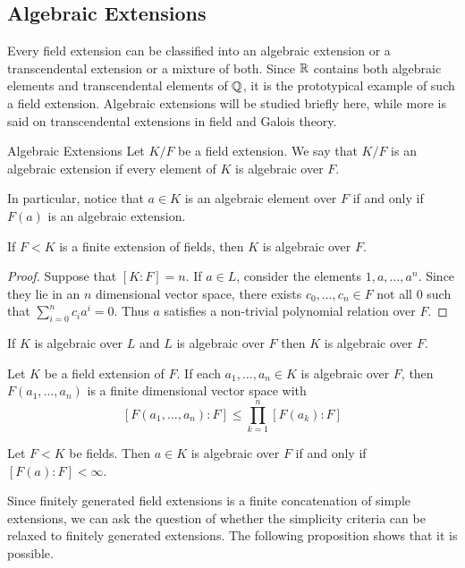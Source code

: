 \documentclass[a4paper]{article}
\begin{document}
\subsection{Algebraic Extensions}
Every field extension can be classified into an algebraic extension or a transcendental extension or a mixture of both. Since $\mathbb{R}$ contains both algebraic elements and transcendental elements of $\mathbb{Q}$, it is the prototypical example of such a field extension. Algebraic extensions will be studied briefly here, while more is said on transcendental extensions in field and Galois theory. 

\begin{defn}{Algebraic Extensions}{} Let $K/F$ be a field extension. We say that $K/F$ is an algebraic extension if every element of $K$ is algebraic over $F$. 
\end{defn}

In particular, notice that $a\in K$ is an algebraic element over $F$ if and only if $F(a)$ is an algebraic extension. 

\begin{lmm}{}{} If $F<K$ is a finite extension of fields, then $K$ is algebraic over $F$. 
\begin{proof}
Suppose that $[K:F]=n$. If $a\in L$, consider the elements $1,a,\dots,a^n$. Since they lie in an $n$ dimensional vector space, there exists $c_0,\dots,c_n\in F$ not all $0$ such that $\sum_{i=0}^nc_ia^i=0$. Thus $a$ satisfies a non-trivial polynomial relation over $F$. 
\end{proof}
\end{lmm}

\begin{thm}{}{} If $K$ is algebraic over $L$ and $L$ is algebraic over $F$ then $K$ is algebraic over $F$. 
\end{thm}

\begin{prp}{}{} Let $K$ be a field extension of $F$. If each $a_1,\dots,a_n\in K$ is algebraic over $F$, then $F(a_1,\dots,a_n)$ is a finite dimensional vector space with $$[F(a_1,\dots,a_n):F]\leq\prod_{k=1}^n[F(a_k):F]$$
\end{prp}

\begin{crl}{}{} Let $F<K$ be fields. Then $a\in K$ is algebraic over $F$ if and only if $[F(a):F]<\infty$. 
\end{crl}

Since finitely generated field extensions is a finite concatenation of simple extensions, we can ask the question of whether the simplicity criteria can be relaxed to finitely generated extensions. The following proposition shows that it is possible. 
\end{document}
